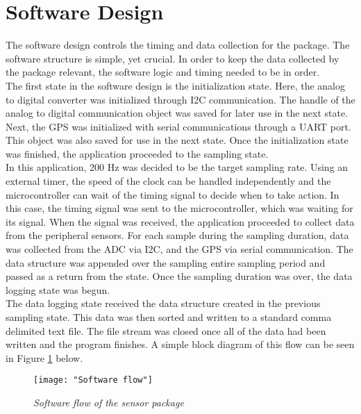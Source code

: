 \section{Software Design}
The software design controls the timing and data collection for the
package. The software structure is simple, yet crucial. In order to
keep the data collected by the package relevant, the software
logic and timing needed to be in order. \\

The first state in the software design is the initialization state.
Here, the analog to digital converter was initialized through I2C
communication. The handle of the analog to digital communication
object was saved for later use in the next state. Next, the GPS
was initialized with serial communications through a UART port.
This object was also saved for use in the next state. Once the
initialization state was finished, the application proceeded
to the sampling state.\\

In this application, 200 Hz was decided to be the target sampling
rate. Using an external timer, the speed of the clock can be
handled independently and the microcontroller can wait of the
timing signal to decide when to take action. In this case, the
timing signal was sent to the microcontroller, which was waiting
for its signal. When the signal was received, the application
proceeded to collect data from the peripheral sensors. For
each sample during the sampling duration, data was collected
from the ADC via I2C, and the GPS via serial communication.
The data structure was appended over the sampling entire
sampling period and passed as a return from the state.
Once the sampling duration was over, the data logging
state was begun. \\

The data logging state received the data structure created in the
previous sampling state. This data was then sorted and written to a
standard comma delimited text file. The file stream was closed
once all of the data had been written and the program finishes. A
simple block diagram of this flow can be seen in Figure
\ref{fig:PRO_SoftFlow} below.

\begin{figure}[H]
\centering
\texttt{[image: "Software flow"]}
\caption{\textit{Software flow of the sensor package}}
\label{fig:PRO_SoftFlow}
\end{figure}